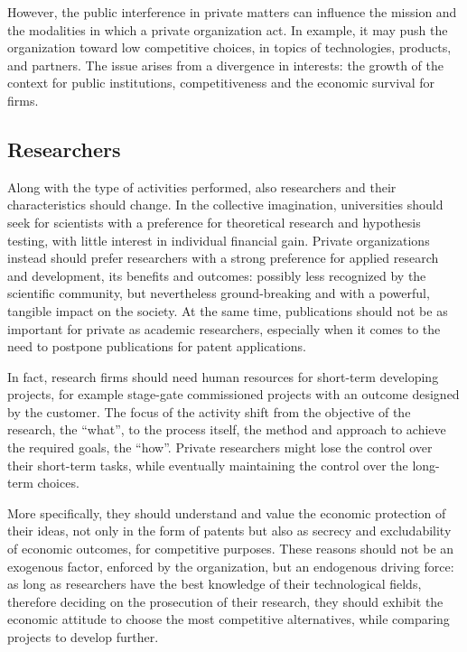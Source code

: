 However, the public interference in private matters can influence the mission and the modalities in which a private organization act. In example, it may push the organization toward low competitive choices, in topics of technologies, products, and partners. The issue arises from a divergence in interests: the growth of the context for public institutions, competitiveness and the economic survival for firms.  

\subsection{Researchers}

Along with the type of activities performed, also researchers and their characteristics should change. In the collective imagination, universities should seek for scientists with a preference for theoretical research and hypothesis testing, with little interest in individual financial gain. Private organizations instead should prefer researchers with a strong preference for applied research and development, its benefits and outcomes: possibly less recognized by the scientific community, but nevertheless ground-breaking and with a powerful, tangible impact on the society. At the same time, publications should not be as important for private as academic researchers, especially when it comes to the need to postpone publications for patent applications.  

In fact, research firms should need human resources for short-term developing projects, for example stage-gate commissioned projects with an outcome designed by the customer. The focus of the activity shift from the objective of the research, the \enquote{what}, to the process itself, the method and approach to achieve the required goals, the \enquote{how}. Private researchers might lose the control over their short-term tasks, while eventually maintaining the control over the long-term choices.

More specifically, they should understand and value the economic protection of their ideas, not only in the form of patents but also as secrecy and excludability of economic outcomes, for competitive purposes. These reasons should not be an exogenous factor, enforced by the organization, but an endogenous driving force: as long as researchers have the best knowledge of their technological fields, therefore deciding on the prosecution of their research, they should exhibit the economic attitude to choose the most competitive alternatives, while comparing projects to develop further.


